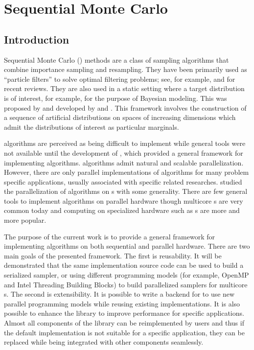 \chapter{Sequential Monte Carlo}
\label{chap:Sequential Monte Carlo}

\section{Introduction}
\label{sec:Introduction}

Sequential Monte Carlo (\smc) methods are a class of sampling algorithms that
combine importance sampling and resampling. They have been primarily used as
``particle filters'' to solve optimal filtering problems; see, for example,
\textcite{Cappe:2007hz} and \textcite{Doucet:2011us} for recent reviews. They
are also used in a static setting where a target distribution is of interest,
for example, for the purpose of Bayesian modeling. This was proposed by
\textcite{DelMoral:2006hc} and developed by \textcite{Peters:2005wh} and
\textcite{DelMoral:2006wv}. This framework involves the construction of a
sequence of artificial distributions on spaces of increasing dimensions which
admit the distributions of interest as particular marginals.

\smc algorithms are perceived as being difficult to implement while general
tools were not available until the development of \textcite{Johansen:2009wd},
which provided a general framework for implementing \smc algorithms. \smc
algorithms admit natural and scalable parallelization. However, there are only
parallel implementations of \smc algorithms for many problem specific
applications, usually associated with specific \smc related researches.
\textcite{Lee:2010fm} studied the parallelization of \smc algorithms on \gpu{}s
with some generality. There are few general tools to implement \smc algorithms
on parallel hardware though multicore \cpu{}s are very common today and
computing on specialized hardware such as \gpu{}s are more and more popular.

The purpose of the current work is to provide a general framework for
implementing \smc algorithms on both sequential and parallel hardware. There
are two main goals of the presented framework. The first is reusability. It
will be demonstrated that the same implementation source code can be used to
build a serialized sampler, or using different programming models (for example,
OpenMP and Intel Threading Building Blocks) to build parallelized samplers for
multicore \cpu{}s. The second is extensibility. It is possible to write a
backend for \vsmc to use new parallel programming models while reusing existing
implementations. It is also possible to enhance the library to improve
performance for specific applications. Almost all components of the library can
be reimplemented by users and thus if the default implementation is not
suitable for a specific application, they can be replaced while being
integrated with other components seamlessly.

